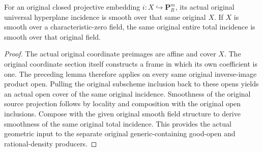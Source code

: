 \begin{theorem}
\label{thm:kn-nadel-bertini-global-incidence-smooth}
\leanok
{}
For an original closed projective embedding $i:X\hookrightarrow\mathbf
P^m_R$, its actual original universal hyperplane incidence is smooth over
that same original $X$. If $X$ is smooth over a characteristic-zero field,
the same original entire total incidence is smooth over that original
field.
\end{theorem}
\begin{proof}
The actual original coordinate preimages are affine and cover $X$. The
original coordinate section itself constructs a frame in which its own
coefficient is one. The preceding lemma therefore applies on every same
original inverse-image product open. Pulling the original subscheme
inclusion back to these opens yields an actual open cover of the same
original incidence. Smoothness of the original source projection follows
by locality and composition with the original open inclusions. Compose
with the given original smooth field structure to derive smoothness of the
same original total incidence. This provides the actual geometric input to the separate original
generic-containing good-open and rational-density producers.
\end{proof}
